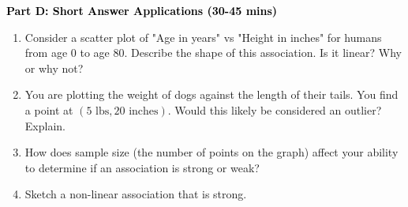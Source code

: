 \documentclass[12pt, letterpaper, fleqn]{article}
\begin{document}
\begin{tcolorbox}[colback=customteal!20]
\large\textcolor{black}{\textbf{Part D: Short Answer Applications (30-45 mins)}}
\end{tcolorbox}

\vspace{3mm}

\begin{enumerate}[itemsep=4.2cm, leftmargin=0.6cm, resume]
\item Consider a scatter plot of "Age in years" vs "Height in inches" for humans from age 0 to age 80. Describe the shape of this association. Is it linear? Why or why not?
\item You are plotting the weight of dogs against the length of their tails. You find a point at $(5\text{ lbs}, 20\text{ inches})$. Would this likely be considered an outlier? Explain.
\item How does sample size (the number of points on the graph) affect your ability to determine if an association is strong or weak?
\item Sketch a non-linear association that is strong.
\end{enumerate}
\end{document}
